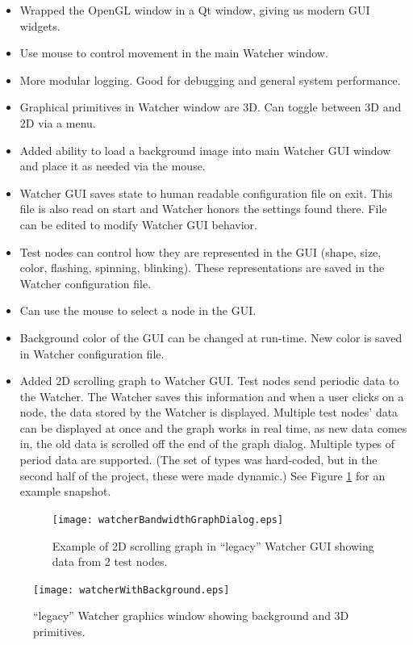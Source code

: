 \documentclass{report}
\begin{document}
\begin{itemize}
\item Wrapped the OpenGL window in a Qt window, giving us modern GUI widgets. 
\item Use mouse to control movement in the main Watcher window.
\item More modular logging. Good for debugging and general system performance.
\item Graphical primitives in Watcher window are 3D. Can toggle between 3D and 2D via a menu.
\item Added ability to load a background image into main Watcher GUI window and place it as needed via the mouse.
\item Watcher GUI saves state to human readable configuration file on exit. This file is also read on start and Watcher honors the 
settings found there. File can be edited to modify Watcher GUI behavior.
\item Test nodes can control how they are represented in the GUI (shape, size, color, flashing, spinning, blinking). These representations
are saved in the Watcher configuration file.
\item Can use the mouse to select a node in the GUI.

\item Background color of the GUI can be changed at run-time. New color is saved in Watcher configuration file.
\item Added 2D scrolling graph to Watcher GUI. Test nodes send periodic data to the Watcher. The Watcher saves this information and when 
a user clicks on a node, the data stored by the Watcher is displayed. Multiple test nodes' data can be displayed at once and the graph
works in real time, as new data comes in, the old data is scrolled off the end of the graph dialog. Multiple types of period data 
are supported.  (The set of types was hard-coded, but in the second half of the project, these were made dynamic.) See Figure \ref{fig:watcherBandwidthGraphDialog} 
for an example snapshot.

\begin{figure}[htb]
\centering
\texttt{[image: watcherBandwidthGraphDialog.eps]}
\caption{Example of 2D scrolling graph in ``legacy'' Watcher GUI showing data from 2 test nodes.}
\label{fig:watcherBandwidthGraphDialog}
\end{figure}

\end{itemize}

\begin{figure}[htb]
\centering
\texttt{[image: watcherWithBackground.eps]}
\caption{``legacy'' Watcher graphics window showing background and 3D primitives.}
\label{fig:watcherWithBackground}
\end{figure}
\end{document}
